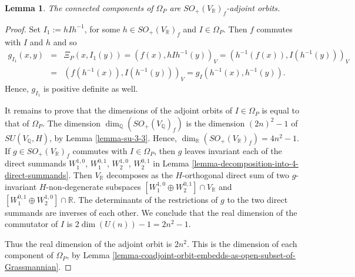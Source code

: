 \documentclass[12pt]{amsart}
\newcommand{\hide}[1]{}
\numberwithin{equation}{subsection}
\theoremstyle{plain}
\newtheorem{lem}[thm]{Lemma}
\theoremstyle{definition}
\newcommand{\CC}{{\mathbb C}}
\newcommand{\QQ}{{\mathbb Q}}
\newcommand{\RR}{{\mathbb R}}
\begin{document}
\begin{lem}
\label{lemma-period-domain-is-an-adjoint-orbit}
The connected components of $\Omega_P$ are $SO_+(V_\RR)_f$-adjoint orbits. 
\end{lem}

\begin{proof}
Set $I_1:=hIh^{-1}$, 
for some $h\in SO_+(V_\RR)_f$ and $I\in\Omega_P$. Then $f$ commutes with $I$ and $h$ and so
\begin{eqnarray*}
g_{I_1}(x,y)&=&\Xi_P(x,I_1(y))=(f(x),hIh^{-1}(y))_V=
(h^{-1}(f(x)),I(h^{-1}(y)))_V\\
&=&(f(h^{-1}(x)),I(h^{-1}(y)))_V
=g_I(h^{-1}(x),h^{-1}(y)).
\end{eqnarray*}
Hence, $g_{I_1}$ is positive definite as well.

It remains to prove that the dimensions of the adjoint orbits of $I\in\Omega_P$ is equal to that of $\Omega_P$.
The dimension $\dim_\QQ(SO_+(V_\QQ)_f)$ is the dimension $(2n)^2-1$ of $SU(V_\QQ,H)$, by Lemma \ref{lemma-su-3-3}.
Hence, $\dim_\RR(SO_+(V_\RR)_f)=4n^2-1$.
If $g\in SO_+(V_\RR)_f$ commutes with $I\in\Omega_P$, then $g$ leaves invariant each of the direct summands $W_1^{1,0}$, $W_1^{0,1}$, $W_2^{1,0}$, $W_2^{0,1}$ in 
Lemma \ref{lemma-decomposition-into-4-direct-summands}. Then $V_\RR$ decomposes as the $H$-orthogonal direct sum of two $g$-invariant $H$-non-degenerate subspaces $[W^{1,0}_1\oplus W^{0,1}_2]\cap V_\RR$ and $[W^{0,1}_1\oplus W^{1,0}_2]\cap \RR$. The determinants of the restrictions of $g$
to the two direct summands are inverses of each other. We conclude that the real dimension of the commutator of $I$ is $2\dim(U(n))-1=2n^2-1$. 
\hide{
Denote by $g_i^{1,0}$ the restriction of $g$ to $W_i^{1,0}$ and define $g_i^{0,1}$ analogously. 
Then $g_2^{0,1}=\overline{g_1^{1,0}}$ and $g_2^{1,0}=\overline{g_1^{0,1}}$, since $\bar{g}=g$. Furthermore, $g_2^{1,0}$ is the inverse transpose of $g_1^{1,0}$
under the identification of $W_2^{1,0}$ with the dual of $W_1^{1,0}$ via the pairing $(\bullet,\bullet)_{V_K}$. 
We see that $g$ is determined by $g_1^{1,0}$.
Furthermore,
\[
\det(g_1^{0,1})=\det(g_2^{0,1})^{-1}=\det(\overline{g_1^{1,0}})^{-1}
\]
Hence, the commutator of $I$ in $SO_+(V_\RR)_f$
is isomorphic to the subgroup of $GL(W_{1,\CC}^{1,0})$ with real determinant, since
\[
1=\det(g_1^{1,0})\det(g_1^{0,1})=\det(g_1^{1,0})\det(\overline{g_1^{1,0}})^{-1}.
\]
We conclude that the real dimension of the commutator of $I$ is $2n^2-1$. 
}
Thus the real dimension of the adjoint orbit is $2n^2$.
This is the dimension of each component of $\Omega_P$, by Lemma \ref{lemma-coadjoint-orbit-embedds-as-open-subset-of-Grassmannian}. 
\end{proof}
\end{document}
